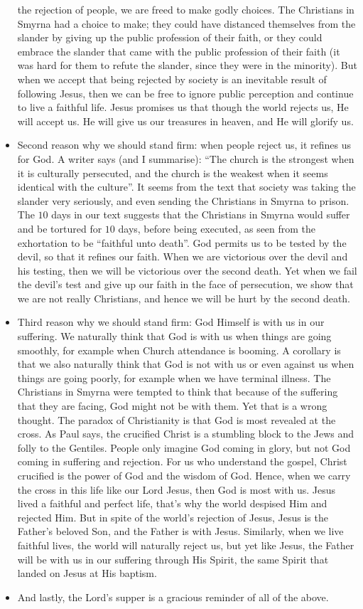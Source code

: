 \begin{itemize}
{  the rejection of people, we are freed to make godly choices.  The
  Christians in Smyrna had a choice to make; they could have distanced
  themselves from the slander by giving up the public profession of their
  faith, or they could embrace the slander that came with the public
  profession of their faith (it was hard for them to refute the slander,
  since they were in the minority).  But when we accept that being rejected
  by society is an inevitable result of following Jesus, then we can be free
  to ignore public perception and continue to live a faithful life.  Jesus
  promises us that though the world rejects us, He will accept us.  He will
  give us our treasures in heaven, and He will glorify us.}
  \item{Second reason why we should stand firm: when people reject us, it
  refines us for God.  A writer says (and I summarise): ``The church is the
  strongest when it is culturally persecuted, and the church is the weakest
  when it seems identical with the culture''.  It seems from the text that
  society was taking the slander very seriously, and even sending the
  Christians in Smyrna to prison.  The $10$ days in our text suggests that
  the Christians in Smyrna would suffer and be tortured for $10$ days, before
  being executed, as seen from the exhortation to be ``faithful unto
  death''.  God permits us to be tested by the devil, so that it refines our
  faith.  When we are victorious over the devil and his testing, then we will
  be victorious over the second death.  Yet when we fail the devil's test and
  give up our faith in the face of persecution, we show that we are not
  really Christians, and hence we will be hurt by the second death.}
  \item{Third reason why we should stand firm: God Himself is with us in our
  suffering.  We naturally think that God is with us when things are going
  smoothly, for example when Church attendance is booming.  A corollary is
  that we also naturally think that God is not with us or even against us
  when things are going poorly, for example when we have terminal illness.
  The Christians in Smyrna were tempted to think that because of the
  suffering that they are facing, God might not be with them.  Yet that is a
  wrong thought.  The paradox of Christianity is that God is most revealed at
  the cross.  As Paul says, the crucified Christ is a stumbling block to the
  Jews and folly to the Gentiles.  People only imagine God coming in glory,
  but not God coming in suffering and rejection.  For us who understand the
  gospel, Christ crucified is the power of God and the wisdom of God.  Hence,
  when we carry the cross in this life like our Lord Jesus, then God is most
  with us.  Jesus lived a faithful and perfect life, that's why the world
  despised Him and rejected Him.  But in spite of the world's rejection of
  Jesus, Jesus is the Father's beloved Son, and the Father is with Jesus.
  Similarly, when we live faithful lives, the world will naturally reject us,
  but yet like Jesus, the Father will be with us in our suffering through His
  Spirit, the same Spirit that landed on Jesus at His baptism.  }
  \item{And lastly, the Lord's supper is a gracious reminder of all of the above.}
\end{itemize}